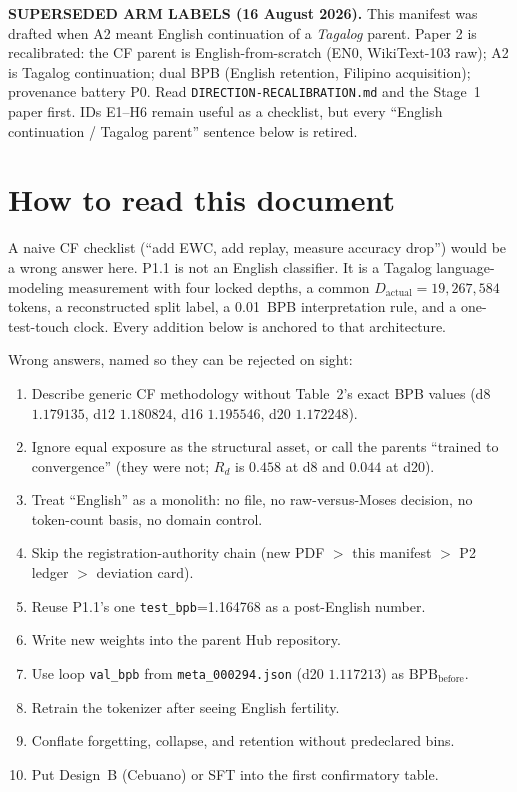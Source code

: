 \documentclass[11pt,a4paper]{article}
\begin{document}
\noindent\textbf{SUPERSEDED ARM LABELS (16 August 2026).} This manifest was drafted when A2 meant English continuation of a \emph{Tagalog} parent. Paper 2 is recalibrated: the CF parent is English-from-scratch (EN0, WikiText-103 raw); A2 is Tagalog continuation; dual BPB (English retention, Filipino acquisition); provenance battery P0. Read \texttt{DIRECTION-RECALIBRATION.md} and the Stage~1 paper first. IDs E1--H6 remain useful as a checklist, but every ``English continuation / Tagalog parent'' sentence below is retired.

\tableofcontents

\section{How to read this document}
\label{sec:howto}

A naive CF checklist (``add EWC, add replay, measure accuracy drop'') would be a wrong answer here. P1.1 is not an English classifier. It is a Tagalog language-modeling measurement with four locked depths, a common $D_{\mathrm{actual}}=19{,}267{,}584$ tokens, a reconstructed split label, a 0.01~BPB interpretation rule, and a one-test-touch clock. Every addition below is anchored to that architecture.

Wrong answers, named so they can be rejected on sight:

\begin{enumerate}
\item Describe generic CF methodology without Table~2's exact BPB values (d8 $1.179135$, d12 $1.180824$, d16 $1.195546$, d20 $1.172248$).
\item Ignore equal exposure as the structural asset, or call the parents ``trained to convergence'' (they were not; $R_d$ is $0.458$ at d8 and $0.044$ at d20).
\item Treat ``English'' as a monolith: no file, no raw-versus-Moses decision, no token-count basis, no domain control.
\item Skip the registration-authority chain (new PDF $>$ this manifest $>$ P2 ledger $>$ deviation card).
\item Reuse P1.1's one \texttt{test\_bpb}=1.164768 as a post-English number.
\item Write new weights into the parent Hub repository.
\item Use loop \texttt{val\_bpb} from \texttt{meta\_000294.json} (d20 $1.117213$) as $\mathrm{BPB}_{\mathrm{before}}$.
\item Retrain the tokenizer after seeing English fertility.
\item Conflate forgetting, collapse, and retention without predeclared bins.
\item Put Design~B (Cebuano) or SFT into the first confirmatory table.
\end{enumerate}
\end{document}
